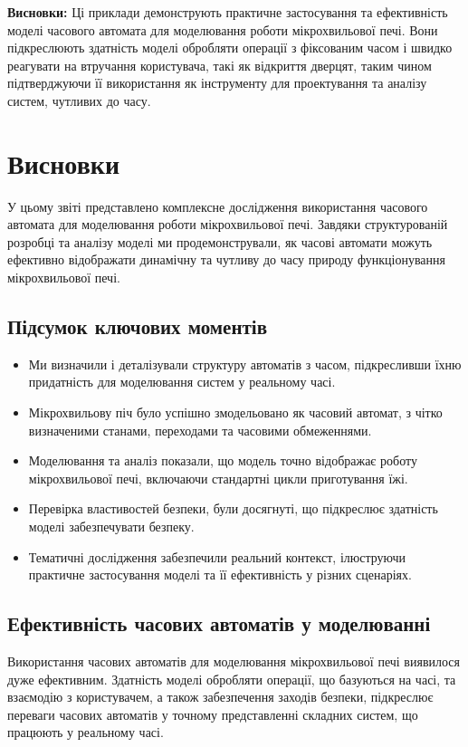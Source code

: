 \documentclass[12pt,a4paper]{article}
\begin{document}
\textbf{Висновки:}
Ці приклади демонструють практичне застосування та ефективність моделі часового автомата для моделювання роботи мікрохвильової печі. Вони підкреслюють здатність моделі обробляти операції з фіксованим часом і швидко реагувати на втручання користувача, такі як відкриття дверцят, таким чином підтверджуючи її використання як інструменту для проектування та аналізу систем, чутливих до часу.


\section{Висновки}

У цьому звіті представлено комплексне дослідження використання часового автомата для моделювання роботи мікрохвильової печі. Завдяки структурованій розробці та аналізу моделі ми продемонстрували, як часові автомати можуть ефективно відображати динамічну та чутливу до часу природу функціонування мікрохвильової печі.

\subsection{Підсумок ключових моментів}
\begin{itemize}
    \item Ми визначили і деталізували структуру автоматів з часом, підкресливши їхню придатність для моделювання систем у реальному часі.
    \item Мікрохвильову піч було успішно змодельовано як часовий автомат, з чітко визначеними станами, переходами та часовими обмеженнями.
    \item Моделювання та аналіз показали, що модель точно відображає роботу мікрохвильової печі, включаючи стандартні цикли приготування їжі.
    \item Перевірка властивостей безпеки, були досягнуті, що підкреслює здатність моделі забезпечувати безпеку.
    \item Тематичні дослідження забезпечили реальний контекст, ілюструючи практичне застосування моделі та її ефективність у різних сценаріях.
\end{itemize}

\subsection{Ефективність часових автоматів у моделюванні}
Використання часових автоматів для моделювання мікрохвильової печі виявилося дуже ефективним. Здатність моделі обробляти операції, що базуються на часі, та взаємодію з користувачем, а також забезпечення заходів безпеки, підкреслює переваги часових автоматів у точному представленні складних систем, що працюють у реальному часі.
\end{document}
